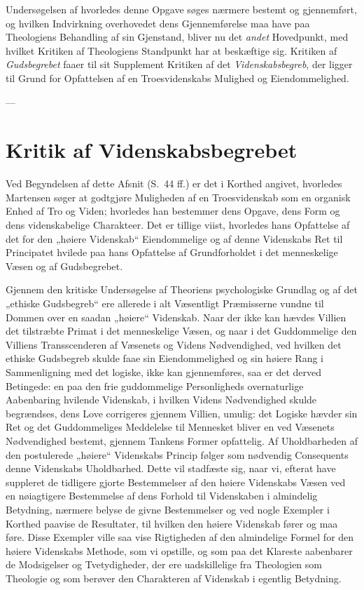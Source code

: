 \documentclass[12pt,a4paper]{book}
\newcommand{\opage}[1]{\marginnote{\footnotesize\textit{[#1]}}}
\begin{document}
Undersøgelsen af hvorledes denne Opgave søges nærmere bestemt og gjennemført, og hvilken
Indvirkning overhovedet dens Gjennemførelse maa have paa Theologiens Behandling af sin
Gjenstand, bliver nu det \emph{andet} Hovedpunkt, med hvilket Kritiken af Theologiens Standpunkt
har at beskæftige sig. Kritiken af \emph{Gudsbegrebet} faaer til sit Supplement Kritiken af det \emph{Videnskabsbegreb}, der ligger til Grund for Opfattelsen af en Troesvidenskabs Mulighed og
Eiendommelighed.

\begin{center}---\end{center}

\section{Kritik af Videnskabsbegrebet}
\label{sec:videnskabsbegreb}

\opage{99}Ved Begyndelsen af dette Afsnit (S.\ 44 ff.) er det i Korthed angivet, hvorledes Martensen
søger at godtgjøre Muligheden af en Troesvidenskab som en organisk Enhed af Tro og Viden;
hvorledes han bestemmer dens Opgave, dens Form og dens videnskabelige Charakteer. Det er
tillige viist, hvorledes hans Opfattelse af det for den „høiere Videnskab“ Eiendommelige
og af denne Videnskabs Ret til Principatet hvilede paa hans Opfattelse af Grundforholdet i
det menneskelige Væsen og af Gudsbegrebet.

Gjennem den kritiske Undersøgelse af Theoriens psychologiske Grundlag og af det „ethiske
Gudsbegreb“ ere allerede i alt Væsentligt Præmisserne vundne til Dommen over en saadan
„høiere“ Videnskab. Naar der ikke kan hævdes Villien det tilstræbte Primat i det
menneskelige Væsen, og naar i det Guddommelige den Villiens Transscenderen af Væsenets og
Videns Nødvendighed, ved hvilken det ethiske Gudsbegreb skulde faae sin Eiendommelighed og
sin høiere Rang i Sammenligning med det logiske, ikke kan gjennemføres, saa er det derved
Betingede: en paa den frie guddommelige Personligheds overnaturlige Aabenbaring hvilende
Videnskab, i hvilken Videns Nødvendighed skulde begrændses, dens Love corrigeres gjennem
Villien, umulig: det Logiske hævder sin Ret og det Guddommeliges Meddelelse til Mennesket
bliver en ved Væsenets Nødvendighed bestemt, gjennem Tankens Former opfattelig. Af
Uholdbarheden af den postulerede „høiere“ Videnskabs Princip følger som nødvendig
Consequents denne Videnskabs Uholdbarhed. Dette vil stadfæste sig, naar vi, efterat have
suppleret de tidligere gjorte Bestemmelser af den høiere Videnskabs Væsen ved en
nøiagtigere Bestemmelse af dens Forhold til Videnskaben i almindelig Betydning, nærmere
belyse de givne Bestemmelser og ved nogle Exempler i Korthed paavise de Resultater, til
hvilken den høiere Videnskab fører og maa føre. Disse Exempler ville saa vise Rigtigheden
af den almindelige Formel for den høiere Videnskabs Methode, som vi opstille, og som paa
det Klareste aabenbarer de Modsigelser og Tvetydigheder, der ere uadskillelige fra
Theologien som \opage{100}Theologie og som berøver den Charakteren af Videnskab i egentlig Betydning.
\end{document}
